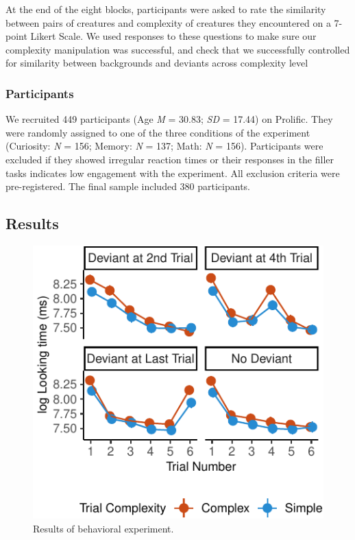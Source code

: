 \documentclass[10pt, letterpaper]{article}
\newenvironment{CodeChunk}{}{}
\begin{document}
At the end of the eight blocks, participants were asked to rate the
similarity between pairs of creatures and complexity of creatures they
encountered on a 7-point Likert Scale. We used responses to these
questions to make sure our complexity manipulation was successful, and
check that we successfully controlled for similarity between backgrounds
and deviants across complexity level

\hypertarget{participants}{%
\subsubsection{Participants}\label{participants}}

We recruited 449 participants (Age \emph{M} = 30.83; \emph{SD} = 17.44)
on Prolific. They were randomly assigned to one of the three conditions
of the experiment (Curiosity: \emph{N} = 156; Memory: \emph{N} = 137;
Math: \emph{N} = 156). Participants were excluded if they showed
irregular reaction times or their responses in the filler tasks
indicates low engagement with the experiment. All exclusion criteria
were pre-registered. The final sample included 380 participants.

\hypertarget{results}{%
\subsection{Results}\label{results}}

\begin{CodeChunk}
\begin{figure}[h]

{\centering \includegraphics{figs/behavioral_result-1} 

}

\caption[Results of behavioral experiment]{Results of behavioral experiment.}\label{fig:behavioral_result}
\end{figure}
\end{CodeChunk}
\end{document}

